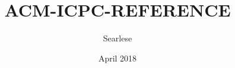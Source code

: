 \documentclass{article}
\title{ACM-ICPC-REFERENCE}
\author{ Searlese }
\date{April 2018}
\begin{document}
\maketitle
\newpage

\begin{multicols*}{2}

\tableofcontents
\newpage

\begin{python}[getContents.py]
\end{python}%

\end{multicols*}
\end{document}
